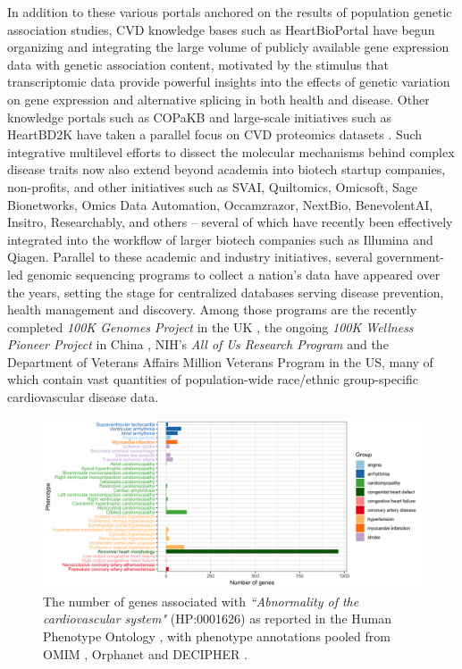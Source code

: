 \documentclass[letter]{bioinfo}
\begin{document}
	In addition to these various portals anchored on the results of population genetic association studies, CVD knowledge bases such as HeartBioPortal \citep{Khomtchouk:2018:HeartBioPortal} have begun organizing and integrating the large volume of publicly available gene expression data with genetic association content, motivated by the stimulus that transcriptomic data provide powerful insights into the effects of genetic variation on gene expression and alternative splicing in both health and disease.  Other knowledge portals such as COPaKB \citep{Zong:2013:Integration} and large-scale initiatives such as HeartBD2K \citep{HeartBD2K} have taken a parallel focus on CVD proteomics datasets \citep{Lau:2016:large}.  Such integrative multilevel efforts to dissect the molecular mechanisms behind complex disease traits now also extend beyond academia into biotech startup companies, non-profits, and other initiatives such as SVAI, Quiltomics, Omicsoft, Sage Bionetworks, Omics Data Automation, Occamzrazor, NextBio, BenevolentAI, Insitro, Researchably, and others -- several of which have recently been effectively integrated into the workflow of larger biotech companies such as Illumina and Qiagen.  Parallel to these academic and industry initiatives, several government-led genomic sequencing programs to collect a nation's data have appeared over the years, setting the stage for centralized databases serving disease prevention, health management and discovery. Among those programs are the recently completed \textit{100K Genomes Project} in the UK \citep{Caulfield:2017:100K}, the ongoing \textit{100K Wellness Pioneer Project} in China \citep{Kalia:2017:China}, NIH's \textit{All of Us Research Program} \citep{NIH:2018:All} and the Department of Veterans Affairs Million Veterans Program \citep{Gaziano:2016:Million} in the US, many of which contain vast quantities of population-wide race/ethnic group-specific cardiovascular disease data.  


		\begin{figure}[!tpb]
		\includegraphics[width=1.\linewidth]{hpo-gene-count}
		\caption{The number of genes associated with \emph{``Abnormality of the cardiovascular system"} (HP:0001626) as reported in the Human Phenotype Ontology \citep{Kohler:2014:Human},
			 with phenotype annotations pooled from OMIM \citep{McKusick:2018:OMIM} , Orphanet \citep{INSERM:1997:Orphanet}  and DECIPHER \citep{Firth:2009:DECIPHER}.}
		\label{fig:hpo_gene_count}	
	\end{figure}
	
\end{document}
